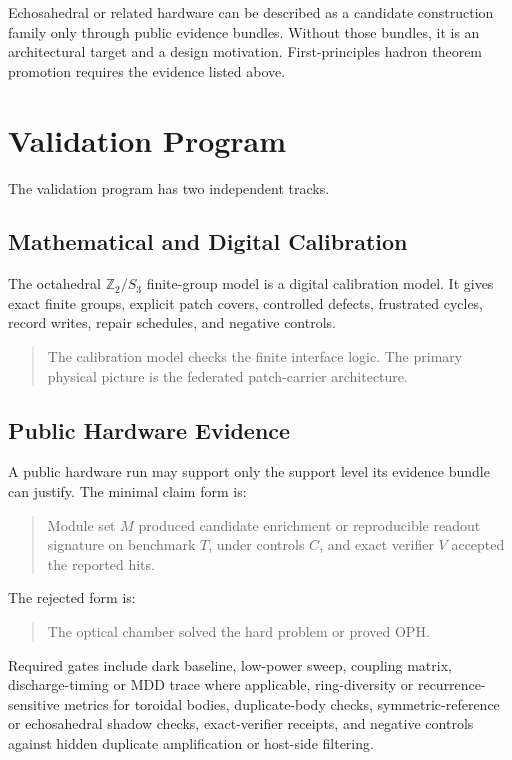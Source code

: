 \documentclass[11pt]{article}
\theoremstyle{remark}
\theoremstyle{plain}
\begin{document}
Echosahedral or related hardware can be described as a candidate construction family only through
public evidence bundles. Without those bundles, it is an architectural target and a design
motivation. First-principles hadron theorem promotion requires the evidence listed above.

\section{Validation Program}

The validation program has two independent tracks.

\subsection{Mathematical and Digital Calibration}

The octahedral \(\mathbb Z_2/S_3\) finite-group model is a digital calibration model. It gives exact
finite groups, explicit patch covers, controlled defects, frustrated cycles, record writes,
repair schedules, and negative controls.
\begin{quote}
The calibration model checks the finite interface logic. The primary physical picture is the
federated patch-carrier architecture.
\end{quote}

\subsection{Public Hardware Evidence}

A public hardware run may support only the support level its evidence bundle can justify. The minimal
claim form is:
\begin{quote}
Module set \(M\) produced candidate enrichment or reproducible readout signature on benchmark
\(T\), under controls \(C\), and exact verifier \(V\) accepted the reported hits.
\end{quote}

The rejected form is:
\begin{quote}
The optical chamber solved the hard problem or proved OPH.
\end{quote}

Required gates include dark baseline, low-power sweep, coupling matrix, discharge-timing or MDD
trace where applicable, ring-diversity or recurrence-sensitive metrics for toroidal bodies,
duplicate-body checks, symmetric-reference or echosahedral shadow checks, exact-verifier receipts,
and negative controls against hidden duplicate amplification or host-side filtering.
\end{document}

